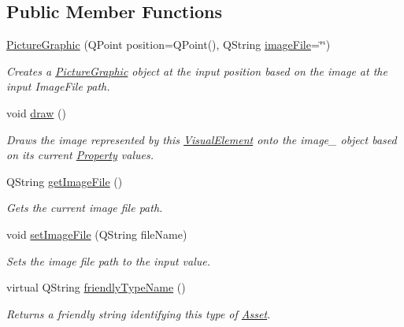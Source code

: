 \subsection*{Public Member Functions}
\begin{DoxyCompactItemize}
\item 
\hyperlink{class_picto_1_1_picture_graphic_a99e7e3b8d05fb094858ba255cec1ce2b}{Picture\-Graphic} (Q\-Point position=Q\-Point(), Q\-String \hyperlink{class_picto_1_1_picture_graphic_ac154fa6eb2a9b4046da01de691f8b56c}{image\-File}=\char`\"{}\char`\"{})
\begin{DoxyCompactList}\small\item\em Creates a \hyperlink{class_picto_1_1_picture_graphic}{Picture\-Graphic} object at the input position based on the image at the input Image\-File path. \end{DoxyCompactList}\item 
\hypertarget{class_picto_1_1_picture_graphic_ac5420c7c2d51b2d9e4563ad0927dc3d1}{void \hyperlink{class_picto_1_1_picture_graphic_ac5420c7c2d51b2d9e4563ad0927dc3d1}{draw} ()}\label{class_picto_1_1_picture_graphic_ac5420c7c2d51b2d9e4563ad0927dc3d1}

\begin{DoxyCompactList}\small\item\em Draws the image represented by this \hyperlink{struct_picto_1_1_visual_element}{Visual\-Element} onto the image\-\_\- object based on its current \hyperlink{class_picto_1_1_property}{Property} values. \end{DoxyCompactList}\item 
\hypertarget{class_picto_1_1_picture_graphic_ac68dff0ebb310d532c967d19fac0e9cb}{Q\-String \hyperlink{class_picto_1_1_picture_graphic_ac68dff0ebb310d532c967d19fac0e9cb}{get\-Image\-File} ()}\label{class_picto_1_1_picture_graphic_ac68dff0ebb310d532c967d19fac0e9cb}

\begin{DoxyCompactList}\small\item\em Gets the current image file path. \end{DoxyCompactList}\item 
\hypertarget{class_picto_1_1_picture_graphic_aa22a64e7d923b4c16cf918660bf933ae}{void \hyperlink{class_picto_1_1_picture_graphic_aa22a64e7d923b4c16cf918660bf933ae}{set\-Image\-File} (Q\-String file\-Name)}\label{class_picto_1_1_picture_graphic_aa22a64e7d923b4c16cf918660bf933ae}

\begin{DoxyCompactList}\small\item\em Sets the image file path to the input value. \end{DoxyCompactList}\item 
virtual Q\-String \hyperlink{class_picto_1_1_picture_graphic_a101e4efb181d2f7166ef83bea31b40be}{friendly\-Type\-Name} ()
\begin{DoxyCompactList}\small\item\em Returns a friendly string identifying this type of \hyperlink{class_picto_1_1_asset}{Asset}. \end{DoxyCompactList}\end{DoxyCompactItemize}
